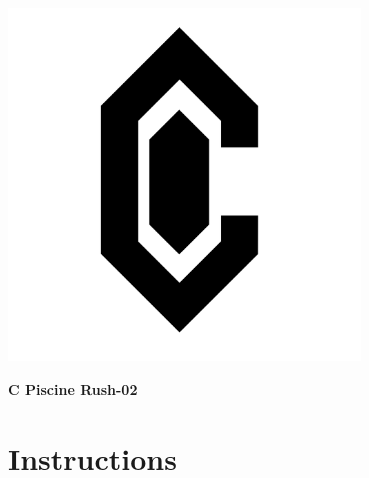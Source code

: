 \documentclass[12pt]{article}
\begin{document}
\begin{center}
  \includegraphics[width=0.7\textwidth]{logo-back.png}
  
  \vspace{1cm} %
  
  {\huge \textbf{C Piscine Rush-02}} %
\end{center}

\newpage
\tableofcontents
\newpage

\section{Instructions}
\end{document}
